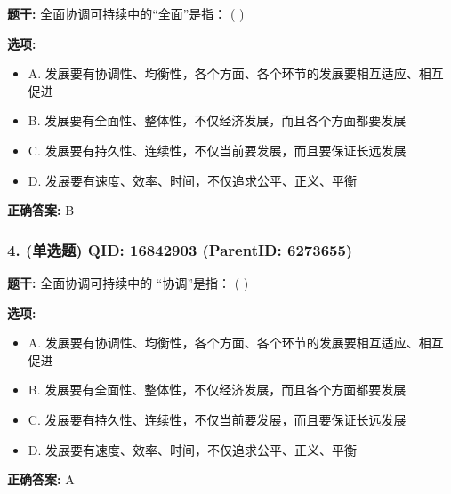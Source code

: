 \documentclass[12pt,UTF8]{ctexart}
\begin{document}
\textbf{题干:}
全面协调可持续中的“全面”是指： ( )



\textbf{选项:}
\begin{itemize}[leftmargin=*]

  \item A. 发展要有协调性、均衡性，各个方面、各个环节的发展要相互适应、相互促进

  \item B. 发展要有全面性、整体性，不仅经济发展，而且各个方面都要发展

  \item C. 发展要有持久性、连续性，不仅当前要发展，而且要保证长远发展

  \item D. 发展要有速度、效率、时间，不仅追求公平、正义、平衡

\end{itemize}

\textbf{正确答案:}
B

\vspace{0.3em}\hrulefill\vspace{0.7em}

\subsubsection*{4. (单选题) \small QID: 16842903 (ParentID: 6273655)}

\textbf{题干:}
全面协调可持续中的 “协调”是指： ( )



\textbf{选项:}
\begin{itemize}[leftmargin=*]

  \item A. 发展要有协调性、均衡性，各个方面、各个环节的发展要相互适应、相互促进

  \item B. 发展要有全面性、整体性，不仅经济发展，而且各个方面都要发展

  \item C. 发展要有持久性、连续性，不仅当前要发展，而且要保证长远发展

  \item D. 发展要有速度、效率、时间，不仅追求公平、正义、平衡

\end{itemize}

\textbf{正确答案:}
A

\vspace{0.3em}\hrulefill\vspace{0.7em}
\end{document}
